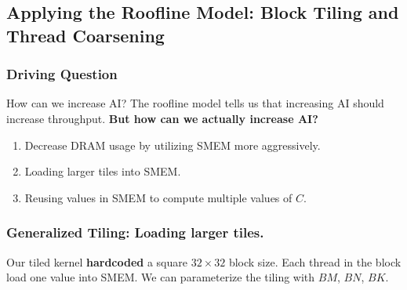 \documentclass[../main.tex]{subfiles}
\begin{document}
\subsection{Applying the Roofline Model: Block Tiling and Thread Coarsening}

\begin{frame}
  \frametitle{Driving Question}

  \begin{alertblock}{How can we increase AI?}
    The roofline model tells us that increasing AI should increase throughput.
    \textbf{But how can we actually increase AI?}
  \end{alertblock}

  \begin{enumerate}
    \item \pause Decrease DRAM usage by utilizing SMEM more aggressively.
    \item \pause Loading larger tiles into SMEM.
    \item \pause Reusing values in SMEM to compute multiple values of \(C\).
  \end{enumerate}
\end{frame}

\begin{frame}
  \frametitle{Generalized Tiling: Loading larger tiles.}
  Our tiled kernel \textbf{hardcoded} a square \(32 \times 32\) block size. Each
  thread in the block load one value into SMEM. We can parameterize the tiling
  with \(BM\), \(BN\), \(BK\).
\end{frame}
\end{document}
